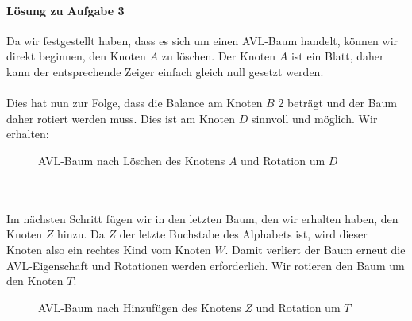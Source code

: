 \documentclass[11pt,a4paper]{scrartcl}
\begin{document}
\paragraph{Lösung zu Aufgabe 3}
\label{a4.3:lsg}
Da wir festgestellt haben, dass es sich um einen AVL-Baum handelt, können wir direkt beginnen, den Knoten $A$ zu löschen. Der Knoten $A$ ist ein Blatt, daher kann der entsprechende Zeiger einfach gleich null gesetzt werden. \\\\
Dies hat nun zur Folge, dass die Balance am Knoten $B$ 2 beträgt und der Baum daher rotiert werden muss. Dies ist am Knoten $D$ sinnvoll und möglich. Wir erhalten:
\begin{figure}[h]
\centering
{}
\caption{AVL-Baum nach Löschen des Knotens $A$ und Rotation um $D$}
\end{figure}
\\\\
Im nächsten Schritt fügen wir in den letzten Baum, den wir erhalten haben, den Knoten $Z$ hinzu. Da $Z$ der letzte Buchstabe des Alphabets ist, wird dieser Knoten also ein rechtes Kind vom Knoten $W$. Damit verliert der Baum erneut die AVL-Eigenschaft und Rotationen werden erforderlich. Wir rotieren den Baum um den Knoten $T$.
\begin{figure}[h]
\centering
{}
\caption{AVL-Baum nach Hinzufügen des Knotens $Z$ und Rotation um $T$}
\end{figure}
\end{document}
